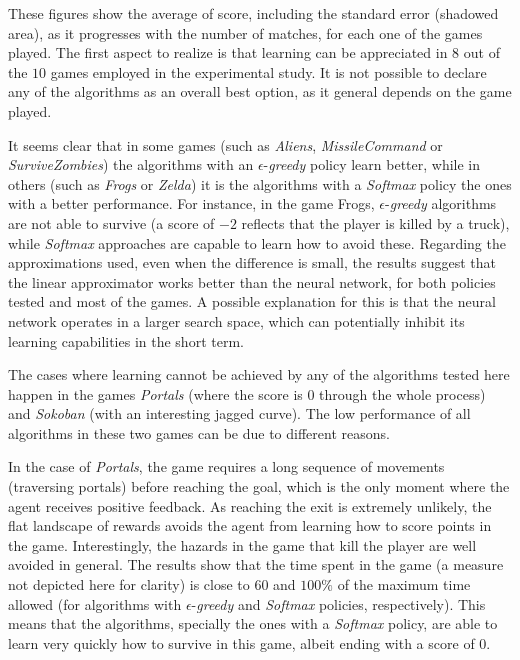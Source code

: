 \documentclass[conference]{IEEEtran}
\begin{document}
These figures show the average of score, including the standard error (shadowed area), as it progresses with the number of matches, for each one of the games played. The first aspect to realize is that learning can be appreciated in $8$ out of the $10$ games employed in the experimental study. It is not possible to declare any of the algorithms as an overall best option, as it general depends on the game played. 

It seems clear that in some games (such as \textit{Aliens}, \textit{MissileCommand} or \textit{SurviveZombies}) the algorithms with an $\epsilon$-\textit{greedy} policy learn better, while in others (such as \textit{Frogs} or \textit{Zelda}) it is the algorithms with a \textit{Softmax} policy the ones with a better performance. For instance, in the game Frogs, $\epsilon$-\textit{greedy} algorithms are not able to survive (a score of $-2$ reflects that the player is killed by a truck), while \textit{Softmax}  approaches are capable to learn how to avoid these. Regarding the approximations used, even when the difference is small, the results suggest that the linear approximator works better than the neural network, for both policies tested and most of the games. A possible explanation for this is that the neural network operates in a larger search space, which can potentially inhibit its learning capabilities in the short term.

The cases where learning cannot be achieved by any of the algorithms tested here happen in the games \textit{Portals} (where the score is $0$ through the whole process) and \textit{Sokoban} (with an interesting jagged curve). The low performance of all algorithms in these two games can be due to different reasons.

In the case of \textit{Portals}, the game requires a long sequence of movements (traversing portals) before reaching the goal, which is the only moment where the agent receives positive feedback. As reaching the exit is extremely unlikely, the flat landscape of rewards avoids the agent from learning how to score points in the game. Interestingly, the hazards in the game that kill the player are well avoided in general. The results show that the time spent in the game (a measure not depicted here for clarity) is close to $60$ and $100\%$ of the maximum time allowed (for algorithms with $\epsilon$-\textit{greedy} and \textit{Softmax} policies, respectively). This means that the algorithms, specially the ones with a \textit{Softmax} policy, are able to learn very quickly how to survive in this game, albeit ending with a score of $0$.
\end{document}
